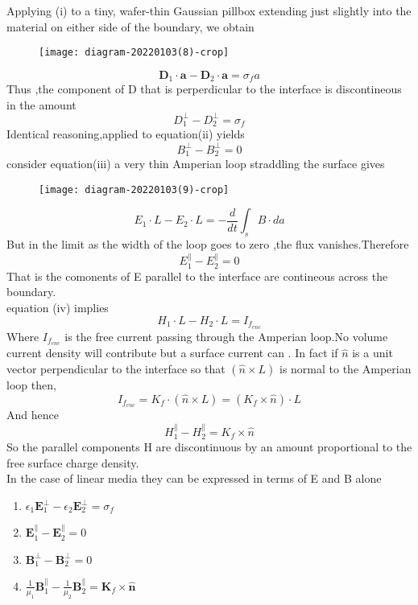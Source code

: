 Applying (i) to a tiny, wafer-thin Gaussian pillbox extending just slightly into the material on either side of the boundary, we obtain \\
\begin{figure}[H]
	\centering
	\texttt{[image: diagram-20220103(8)-crop]}
	\caption{}
	\label{}
\end{figure}
$$\mathbf{D}_{1} \cdot \mathbf{a}-\mathbf{D}_{2} \cdot \mathbf{a}=\sigma_{f} a$$
Thus ,the component of D that is perperdicular to the interface is discontineous in the amount \\
$$D_{1}^{\perp}-D_{2}^{\perp}=\sigma_{f}$$
Identical reasoning,applied to equation(ii) yields\\
$$B_1^{\perp}-B_2^{\perp}=0$$
consider equation(iii) a very thin Amperian loop straddling the surface gives\\
\begin{figure}[H]
	\centering
	\texttt{[image: diagram-20220103(9)-crop]}
	\caption{}
	\label{}
\end{figure}
$$E_1\cdot L-E_2\cdot L=-\frac{d}{dt} \int_{s} B\cdot da$$
But in the limit as the width of the loop goes to zero ,the flux vanishes.Therefore\\
$$E_1^{\parallel}-E_2^{\parallel}=0$$
That is the comonents of E parallel to the interface are contineous across the boundary.\\
equation (iv)  implies \\
$$H_1 \cdot L-H_2\cdot L=I_{f_{enc}}$$
Where $I_{f_{enc}}$ is the free current passing through the Amperian loop.No volume current density will contribute but a surface current can . In fact if $\hat{n}$ is a unit vector perpendicular to the interface so that $(\hat{n}\times L)$ is normal to the Amperian loop then,
$$I_{f_{enc}}=K_f \cdot (\hat{n}\times L)=(K_f\times \hat{n})\cdot L$$
And hence $$H_1^{\parallel}-H_2^{\parallel}=K_f\times \hat{n}$$
So the parallel components  H are discontinuous by an amount proportional to the free surface charge density.\\
In the case of linear media they can be expressed in terms of E and B alone 

\begin{enumerate}[label=(\roman*)]
	\item $\epsilon_{1} \mathbf{E}_{1}^{\perp}-\epsilon_{2} \mathbf{E}_{2}^{\perp}=\sigma_{f}$
	\item  $\mathbf{E}_{1}^{\|}-\mathbf{E}_{2}^{\|}=0$
	\item $\mathbf{B}_{1}^{\perp}-\mathbf{B}_{2}^{\perp}=0$
	\item $\frac{1}{\mu_{1}} \mathbf{B}_{1}^{\|}-\frac{1}{\mu_{2}} \mathbf{B}_{2}^{\|}=\mathbf{K}_{f} \times \hat{\mathbf{n}}$
\end{enumerate}

